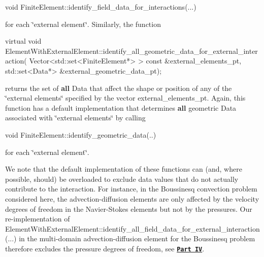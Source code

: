 \begin{DoxyCode}
\textcolor{keywordtype}{void} FiniteElement::identify\_field\_data\_for\_interactions(...)
\end{DoxyCode}


for each \char`\"{}external element\char`\"{}. Similarly, the function


\begin{DoxyCode}
\textcolor{keyword}{virtual} \textcolor{keywordtype}{void}  ElementWithExternalElement::identify\_all\_geometric\_data\_for\_external\_interaction(
    Vector<std::set<FiniteElement*> >  \textcolor{keyword}{const} &external\_elements\_pt,
    std::set<Data*> &external\_geometric\_data\_pt);
\end{DoxyCode}


returns the set of {\bfseries all} {\ttfamily Data} that affect the shape or position of any of the \char`\"{}external elements\char`\"{} specified by the vector {\ttfamily external\+\_\+elements\+\_\+pt}. Again, this function has a default implementation that determines {\bfseries all} geometric Data associated with \char`\"{}external elements\char`\"{} by calling


\begin{DoxyCode}
\textcolor{keywordtype}{void} FiniteElement::identify\_geometric\_data(..)
\end{DoxyCode}


for each \char`\"{}external element\char`\"{}.

We note that the default implementation of these functions can (and, where possible, should) be overloaded to exclude data values that do not actually contribute to the interaction. For instance, in the Boussinesq convection problem considered here, the advection-\/diffusion elements are only affected by the velocity degrees of freedom in the Navier-\/\+Stokes elements but not by the pressures. Our re-\/implementation of {\ttfamily Element\+With\+External\+Element\+::identify\+\_\+all\+\_\+field\+\_\+data\+\_\+for\+\_\+external\+\_\+interaction}(...) in the multi-\/domain advection-\/diffusion element for the Boussinesq problem therefore excludes the pressure degrees of freedom, see \href{#optimise}{\tt {\bfseries Part IV}}.



